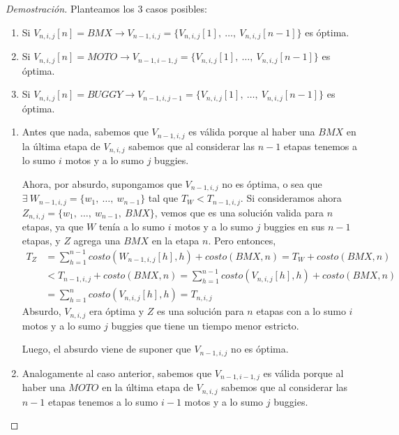     \begin{proof}[Demostración]
        Planteamos los 3 casos posibles:
        \begin{enumerate}
            \item Si $V_{n,i,j}[n] = BMX \rightarrow V_{n-1,i,j} = \{V_{n,i,j}[1],\ \dots,\ V_{n,i,j}[n-1]\}$ es óptima.
            \item Si $V_{n,i,j}[n] = MOTO \rightarrow V_{n-1,i-1,j} = \{V_{n,i,j}[1],\ \dots,\ V_{n,i,j}[n-1]\}$ es óptima.
            \item Si $V_{n,i,j}[n] = BUGGY \rightarrow V_{n-1,i,j-1} = \{V_{n,i,j}[1],\ \dots,\ V_{n,i,j}[n-1]\}$ es óptima.
        \end{enumerate}

        \begin{enumerate}
            \item Antes que nada, sabemos que $V_{n-1,i,j}$ es válida porque al haber una $BMX$ en la última etapa de $V_{n,i,j}$ sabemos que al considerar las $n-1$ etapas tenemos a lo sumo $i$ motos y a lo sumo $j$ buggies.

            Ahora, por absurdo, supongamos que $V_{n-1,i,j}$ no es óptima, o sea que $\exists\ W_{n-1,i,j} = \{w_1,\ \dots,\ w_{n-1}\}$ tal que $T_{W} < T_{n-1,i,j}$.
            Si consideramos ahora $Z_{n,i,j} = \{w_1,\ \dots,\ w_{n-1},\ BMX\}$, vemos que es una solución valida para $n$ etapas, ya que $W$ tenía a lo sumo $i$ motos y a lo sumo $j$ buggies en sus $n-1$ etapas, y $Z$ agrega una $BMX$ en la etapa $n$.
            Pero entonces,
            \begin{equation*}
                \begin{aligned}
                    T_{Z} &= \sum_{h=1}^{n-1}{costo(W_{n-1,i,j}[h], h)} + costo(BMX,n) = T_{W} + costo(BMX,n) \\
                          &< T_{n-1,i,j} + costo(BMX,n) = \sum_{h=1}^{n-1}{costo(V_{n,i,j}[h], h)} + costo(BMX,n) \\
                          &= \sum_{h=1}^{n}{costo(V_{n,i,j}[h], h)} = T_{n,i,j}
                \end{aligned}
            \end{equation*}
            Absurdo, $V_{n,i,j}$ era óptima y $Z$ es una solución para $n$ etapas con a lo sumo $i$ motos y a lo sumo $j$ buggies que tiene un tiempo menor estricto.

            Luego, el absurdo viene de suponer que $V_{n-1,i,j}$ no es óptima.
            \item Analogamente al caso anterior, sabemos que $V_{n-1,i-1,j}$ es válida porque al haber una $MOTO$ en la última etapa de $V_{n,i,j}$ sabemos que al considerar las $n-1$ etapas tenemos a lo sumo $i-1$ motos y a lo sumo $j$ buggies.


\end{enumerate}
\end{proof}
